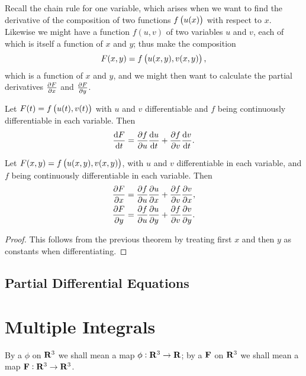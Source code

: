 Recall the chain rule for one variable, which arises when we want to find the derivative of the composition of two functions $f\left(u(x)\right)$ with respect to $x$. 
Likewise we might have a function $f(u,v)$ of two variables $u$ and $v$, each of which is itself a function of $x$ and $y$; thus make the composition
\[F(x,y)=f\left(u(x,y),v(x,y)\right),\]
which is a function of $x$ and $y$, and we might then want to calculate the partial derivatives $\pdv{F}{x}$ and $\pdv{F}{y}$.

\begin{lemma}
Let $F(t)=f\left(u(t),v(t)\right)$ with $u$ and $v$ differentiable and $f$ being continuously differentiable in each variable. Then
\begin{equation}
\dv{F}{t}=\pdv{f}{u}\dv{u}{t}+\pdv{f}{v}\dv{v}{t}.
\end{equation}
\end{lemma}

\begin{corollary}
Let $F(x,y)=f\left(u(x,y),v(x,y)\right)$, with $u$ and $v$ differentiable in each variable, and $f$ being continuously differentiable in each variable. Then
\begin{equation}
\begin{split}
\pdv{F}{x}&=\pdv{f}{u}\pdv{u}{x}+\pdv{f}{v}\pdv{v}{x},\\
\pdv{F}{y}&=\pdv{f}{u}\pdv{u}{y}+\pdv{f}{v}\pdv{v}{y}.
\end{split}
\end{equation}
\end{corollary}

\begin{proof}
This follows from the previous theorem by treating first $x$ and then $y$ as constants when differentiating.
\end{proof}

\subsection{Partial Differential Equations}

\pagebreak

\section{Multiple Integrals}
\begin{definition}
By a  $\phi$ on $\mathbf R^3$ we shall mean a map $\phi:\mathbf R^3\to\mathbf R$; by a  $\vb{F}$ on $\mathbf R^3$ we shall mean a map $\vb{F}:\mathbf R^3\to\mathbf R^3$.
\end{definition}

